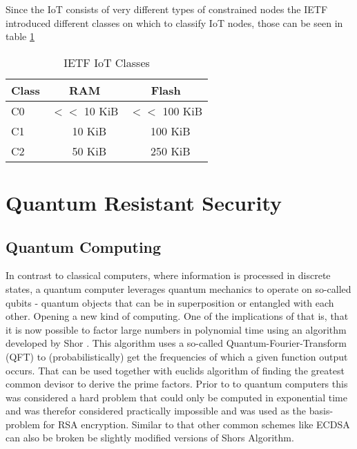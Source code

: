 \documentclass[conference]{IEEEtran}
\begin{document}
Since the IoT consists of very different types of constrained nodes the IETF introduced different classes on which to classify IoT nodes, those can be seen in table \ref{IoT-classes}

\begin{table}
    \label{IoT-classes}
    \centering
    \caption{IETF IoT Classes}
    \begin{tabular}{|l | c c|}
        \hline
        Class & RAM & Flash \\
        \hline
        C0 & $<<$ 10 KiB & $<<$ 100 KiB\\
        C1 & ~ 10 KiB & ~ 100 KiB\\
        C2 & ~ 50 KiB & ~ 250 KiB\\
        \hline
    \end{tabular} 
\end{table}



\section{Quantum Resistant Security}
\subsection{Quantum Computing}\label{l:quantum_computing}
In contrast to classical computers, where information is processed in discrete states, a quantum computer leverages quantum mechanics to operate on so-called qubits - quantum objects that can be in superposition or entangled with each other. 
Opening a new kind of computing. 
One of the implications of that is, that it is now possible to factor large numbers in polynomial time using an algorithm developed by Shor \cite{Shor}. 
This algorithm uses a so-called Quantum-Fourier-Transform (QFT) to (probabilistically) get the frequencies of which a given function output occurs. That can be used together with euclids algorithm of finding the greatest common devisor to derive the prime factors. 
Prior to to quantum computers this was considered a hard problem that could only be computed in exponential time and was therefor considered practically impossible and was used as the basis-problem for RSA encryption.
Similar to that other common schemes like ECDSA can also be broken be slightly modified versions of Shors Algorithm.
\end{document}
